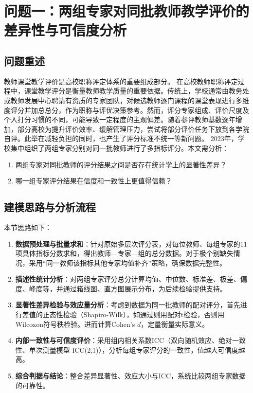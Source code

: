 \section{问题一：两组专家对同批教师教学评价的差异性与可信度分析}

\subsection{问题重述}
教师课堂教学评价是高校职称评定体系的重要组成部分。
在高校教师职称评定过程中，课堂教学评分是衡量教师教学质量的重要依据。传统上，学校通常由教务处或教师发展中心聘请有资质的专家团队，对候选教师逐门课程的课堂表现进行多维度评分并加总总分，作为职称与评优决策参考。然而，评分专家组成、评价尺度及个人打分习惯的不同，可能导致一定程度的主观偏差。随着参评教师基数逐年增加，部分高校为提升评价效率、缓解管理压力，尝试将部分评价任务下放到各学院自评。此举在减轻负担的同时，也产生了评分标准不统一等新问题。
2023年，学校集中组织了两组专家分别对同一批教师进行了多指标评分。本文需分析：
\begin{enumerate}
    \item 两组专家对同批教师的评分结果之间是否存在统计学上的显著性差异？
    \item 哪一组专家评分结果在信度和一致性上更值得信赖？
\end{enumerate}
\subsection{建模思路与分析流程}
本节思路如下：

\begin{enumerate}
    \item \textbf{数据预处理与批量求和}：针对原始多层次评分表，对每位教师、每组专家的11项具体指标分数求和，得出教师—专家—组的总分数据。对于极个别缺失情况，采用“同一教师该指标其他专家均值补齐”策略，确保数据完整性。
    \item \textbf{描述性统计分析}：对两组专家评分总分计算均值、中位数、标准差、极差、偏度、峰度等，并通过箱线图、直方图展示分布，为后续检验提供支持。
    \item \textbf{显著性差异检验与效应量分析}：考虑到数据为同一批教师的配对评分，首先进行差值的正态性检验（Shapiro-Wilk），如通过则用配对t检验，否则用Wilcoxon符号秩检验。进而计算Cohen's $d$，定量衡量实际意义。
    \item \textbf{内部一致性与可信度评价}：采用组内相关系数ICC（双向随机效应、绝对一致性、单次测量模型 ICC(2,1)），分析每组专家评分的一致性，值越大可信度越高。
    \item \textbf{综合判据与结论}：整合差异显著性、效应大小与ICC，系统比较两组专家数据的可靠性。
\end{enumerate}

